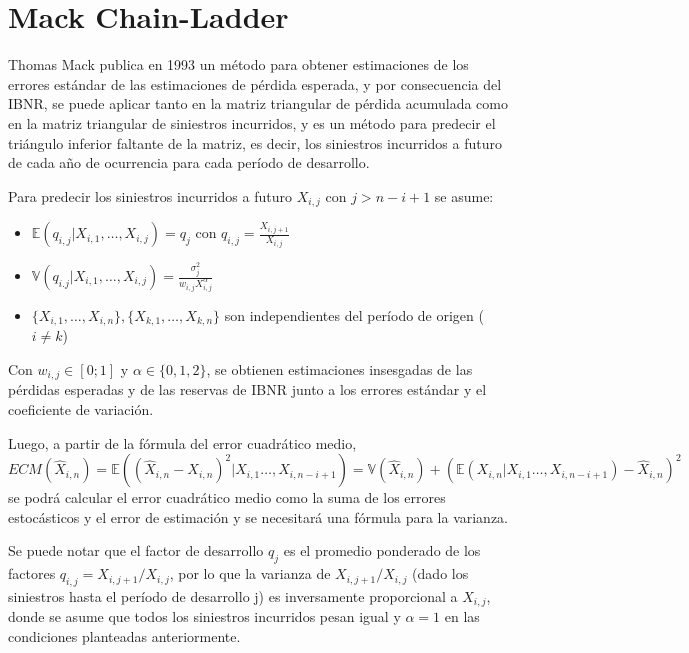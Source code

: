 \documentclass[
  12pt,
]{article}
\begin{document}
\hypertarget{mack-chain-ladder}{%
\section{Mack Chain-Ladder}\label{mack-chain-ladder}}

Thomas Mack publica en 1993 un método para obtener estimaciones de los
errores estándar de las estimaciones de pérdida esperada, y por
consecuencia del IBNR, se puede aplicar tanto en la matriz triangular de
pérdida acumulada como en la matriz triangular de siniestros incurridos,
y es un método para predecir el triángulo inferior faltante de la
matriz, es decir, los siniestros incurridos a futuro de cada año de
ocurrencia para cada período de desarrollo.

Para predecir los siniestros incurridos a futuro \(X_{i,j}\) con
\(j>n-i+1\) se asume:

\begin{itemize}

\item $\mathbb{E}(q_{i,j}|X_{i,1},\ldots,X_{i,j}) = q_j$ con $q_{i,j} = \frac{X_{i,j+1}}{X_{i,j}}$

\item $\mathbb{V}(q_{i.j}|X_{i,1},\ldots,X_{i,j}) = \frac{\sigma^2_j}{w_{i,j}X_{i,j}^\alpha} $

\item $\{ X_{i,1},\ldots,X_{i,n} \}, \{X_{k,1},\ldots,X_{k,n}\}$ son independientes del período de origen ($i \neq k$)

\end{itemize}

Con \(w_{i,j} \in [0;1]\) y \(\alpha \in \{0,1,2\}\), se obtienen
estimaciones insesgadas de las pérdidas esperadas y de las reservas de
IBNR junto a los errores estándar y el coeficiente de variación.

Luego, a partir de la fórmula del error cuadrático medio,
\(ECM(\hat{X}_{i,n})=\mathbb{E}((\hat{X}_{i,n}-X_{i,n})^2|X_{i,1}\ldots,X_{i,n-i+1})=\mathbb{V}(\hat{X}_{i,n}) + (\mathbb{E}(X_{i,n}|X_{i,1}\ldots,X_{i,n-i+1})-\hat{X}_{i,n})^2\)
se podrá calcular el error cuadrático medio como la suma de los errores
estocásticos y el error de estimación y se necesitará una fórmula para
la varianza.

Se puede notar que el factor de desarrollo \(q_j\) es el promedio
ponderado de los factores \(q_{i,j}=X_{i,j+1}/X_{i,j}\), por lo que la
varianza de \(X_{i,j+1}/X_{i,j}\) (dado los siniestros hasta el período
de desarrollo j) es inversamente proporcional a \(X_{i,j}\), donde se
asume que todos los siniestros incurridos pesan igual y \(\alpha=1\) en
las condiciones planteadas anteriormente.
\end{document}
